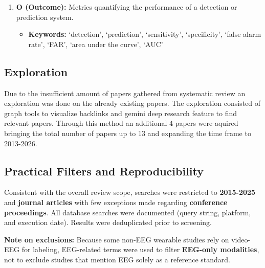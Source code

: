 \begin{enumerate}
    \item \textbf{O (Outcome):} Metrics quantifying the performance of a detection or prediction system.
    \begin{itemize}
        \item \textbf{Keywords:} `detection', `prediction', `sensitivity', `specificity', `false alarm rate', `FAR', `area under the curve', `AUC'
    \end{itemize}

\end{enumerate}

\subsection{Exploration}

Due to the insufficient amount of papers gathered from systematic review an exploration was done on the already existing papers.
The exploration consisted of graph tools to visualize backlinks and gemini deep research feature to find relevant papers.
Through this method an additional 4 papers were aquired bringing the total number of papers up to 13 and expanding the time
frame to 2013-2026.

\subsection{Practical Filters and Reproducibility}
Consistent with the overall review scope, searches were restricted to
\textbf{2015-2025} and \textbf{journal articles} with few exceptions
made regarding \textbf{conference proceedings}.
All database searches were documented (query string, platform, and
execution date). Results were deduplicated prior to screening.

\noindent\textbf{Note on exclusions:}
Because some non-EEG wearable studies rely on video-EEG for labeling,
EEG-related terms were used to filter \textbf{EEG-only modalities}, not to
exclude studies that mention EEG solely as a reference standard.
